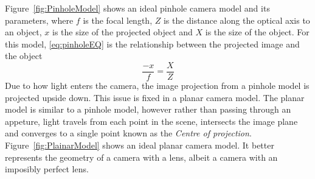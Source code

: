 \documentclass{UoNMCHA}
\numberwithin{equation}{section}
\begin{document}
Figure~\ref{fig:PinholeModel} shows an ideal pinhole camera model and its parameters, where $f$ is the focal length, $Z$ is the distance along the optical axis to an object, $x$ is the size of the projected object and $X$ is the size of the object. For this model, \eqref{eq:pinholeEQ} is the relationship between the projected image and the object
\begin{equation}\label{eq:pinholeEQ}
	\frac{-x}{f} = \frac{X}{Z}
\end{equation}
Due to how light enters the camera, the image projection from a pinhole model is projected upside down. This issue is fixed in a planar camera model. The planar model is similar to a pinhole model, however rather than passing through an appeture, light travels from each point in the scene, intersects the image plane and converges to a single point known as the \textit{Centre of projection}. Figure~\ref{fig:PlainarModel} shows an ideal planar camera model. It better represents the geometry of a camera with a lens, albeit a camera with an imposibly perfect lens.
\end{document}
